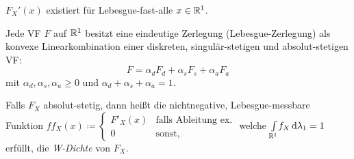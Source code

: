 \documentclass{cheat-sheet}
\begin{document}
\begin{satz}
  $F_X'(x)$ existiert für Lebesgue-fast-alle $x \in \mathbb{R}^1$.
\end{satz}

\begin{satz}
  Jede VF $F$ auf $\mathbb{R}^1$ besitzt eine eindeutige Zerlegung (Lebesgue-Zerlegung) als konvexe Linearkombination einer diskreten, singulär-stetigen und absolut-stetigen VF:
  \[ F = \alpha_d F_d + \alpha_s F_s + \alpha_a F_a \]
  mit $\alpha_d, \alpha_s, \alpha_a \geq 0$ und $\alpha_d + \alpha_s + \alpha_a = 1$.
\end{satz}

\begin{defn}
  Falls $F_X$ absolut-stetig, dann heißt die nichtnegative, Lebesgue-messbare Funktion $ff_X(x) \coloneqq \begin{cases} F'_X(x) & \text{falls Ableitung ex.} \\ 0 & \text{sonst,} \end{cases}$
  welche ${\textstyle \int\limits_{\mathbb{R}^1}^{}} f_X \,\mathrm{d} \lambda_1 = 1$ erfüllt, die \emph{W-Dichte} von $F_X$.
\end{defn}
\end{document}

